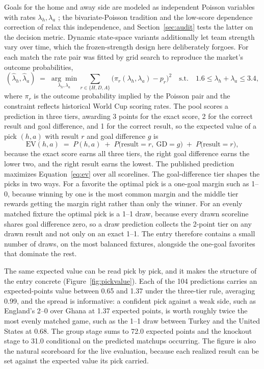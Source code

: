 \documentclass[11pt,letterpaper]{article}
\begin{document}
Goals for the home and away side are modeled as independent Poisson variables with rates $\lambda_h, \lambda_a$ \citep{maher1982}; the bivariate-Poisson tradition \citep{karlis2003} and the low-score dependence correction of \citet{dixoncoles1997} relax this independence, and Section~\ref{sec:audit} tests the latter on the decision metric. Dynamic state-space variants \citep{koopmanlit2015} additionally let team strength vary over time, which the frozen-strength design here deliberately forgoes. For each match the rate pair was fitted by grid search to reproduce the market's outcome probabilities,
\begin{equation}
(\hat\lambda_h, \hat\lambda_a) \;=\; \underset{\lambda_h,\lambda_a}{\arg\min} \sum_{r \in \{H,D,A\}} \bigl(\pi_r(\lambda_h,\lambda_a) - p_r\bigr)^2
\quad \text{s.t.} \quad 1.6 \le \lambda_h + \lambda_a \le 3.4,
\end{equation}
where $\pi_r$ is the outcome probability implied by the Poisson pair and the constraint reflects historical World Cup scoring rates. The pool scores a prediction in three tiers, awarding 3 points for the exact score, 2 for the correct result and goal difference, and 1 for the correct result, so the expected value of a pick $(h,a)$ with result $r$ and goal difference $g$ is
\begin{equation}
\mathrm{EV}(h,a) \;=\; P(h,a) \;+\; P\bigl(\text{result}=r,\ \text{GD}=g\bigr) \;+\; P\bigl(\text{result}=r\bigr),
\label{eq:ev}
\end{equation}
because the exact score earns all three tiers, the right goal difference earns the lower two, and the right result earns the lowest. The published prediction maximizes Equation~\eqref{eq:ev} over all scorelines. The goal-difference tier shapes the picks in two ways. For a favorite the optimal pick is a one-goal margin such as 1--0, because winning by one is the most common margin and the middle tier rewards getting the margin right rather than only the winner. For an evenly matched fixture the optimal pick is a 1--1 draw, because every drawn scoreline shares goal difference zero, so a draw prediction collects the 2-point tier on any drawn result and not only on an exact 1--1. The entry therefore contains a small number of draws, on the most balanced fixtures, alongside the one-goal favorites that dominate the rest.

The same expected value can be read pick by pick, and it makes the structure of the entry concrete (Figure~\ref{fig:pickvalue}). Each of the 104 predictions carries an expected-points value between 0.65 and 1.37 under the three-tier rule, averaging 0.99, and the spread is informative: a confident pick against a weak side, such as England's 2--0 over Ghana at 1.37 expected points, is worth roughly twice the most evenly matched game, such as the 1--1 draw between Turkey and the United States at 0.68. The group stage sums to 72.0 expected points and the knockout stage to 31.0 conditional on the predicted matchups occurring. The figure is also the natural scoreboard for the live evaluation, because each realized result can be set against the expected value its pick carried.
\end{document}
